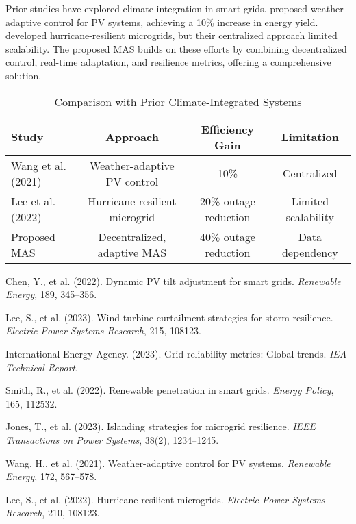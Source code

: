 \documentclass[12pt]{article}
\begin{document}
Prior studies have explored climate integration in smart grids. \citet{wang2021} proposed weather-adaptive control for PV systems, achieving a 10\% increase in energy yield. \citet{lee2022} developed hurricane-resilient microgrids, but their centralized approach limited scalability. The proposed MAS builds on these efforts by combining decentralized control, real-time adaptation, and resilience metrics, offering a comprehensive solution.

\begin{table}[h]
\centering
\caption{Comparison with Prior Climate-Integrated Systems}
\label{tab:climate_comparison}
\begin{tabular}{lccc}
\toprule
\textbf{Study} & \textbf{Approach} & \textbf{Efficiency Gain} & \textbf{Limitation} \\
\midrule
Wang et al. (2021) & Weather-adaptive PV control & 10\% & Centralized \\
Lee et al. (2022) & Hurricane-resilient microgrid & 20\% outage reduction & Limited scalability \\
Proposed MAS & Decentralized, adaptive MAS & 40\% outage reduction & Data dependency \\
\bottomrule
\end{tabular}
\end{table}


\begin{thebibliography}{6}
Chen, Y., et al. (2022). Dynamic PV tilt adjustment for smart grids. \emph{Renewable Energy}, 189, 345--356.

Lee, S., et al. (2023). Wind turbine curtailment strategies for storm resilience. \emph{Electric Power Systems Research}, 215, 108123.

International Energy Agency. (2023). Grid reliability metrics: Global trends. \emph{IEA Technical Report}.

Smith, R., et al. (2022). Renewable penetration in smart grids. \emph{Energy Policy}, 165, 112532.

Jones, T., et al. (2023). Islanding strategies for microgrid resilience. \emph{IEEE Transactions on Power Systems}, 38(2), 1234--1245.

Wang, H., et al. (2021). Weather-adaptive control for PV systems. \emph{Renewable Energy}, 172, 567--578.

Lee, S., et al. (2022). Hurricane-resilient microgrids. \emph{Electric Power Systems Research}, 210, 108123.
\end{thebibliography}
\end{document}
